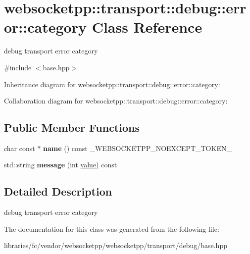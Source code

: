 \hypertarget{classwebsocketpp_1_1transport_1_1debug_1_1error_1_1category}{}\section{websocketpp\+:\+:transport\+:\+:debug\+:\+:error\+:\+:category Class Reference}
\label{classwebsocketpp_1_1transport_1_1debug_1_1error_1_1category}


debug transport error category  




{\ttfamily \#include $<$base.\+hpp$>$}



Inheritance diagram for websocketpp\+:\+:transport\+:\+:debug\+:\+:error\+:\+:category\+:


Collaboration diagram for websocketpp\+:\+:transport\+:\+:debug\+:\+:error\+:\+:category\+:
\subsection*{Public Member Functions}
\begin{DoxyCompactItemize}
\item 
\mbox{\label{classwebsocketpp_1_1transport_1_1debug_1_1error_1_1category_a19f55b05a90e1e825a4caabd86f8ce90}} 
char const  $\ast$ {\bfseries name} () const \+\_\+\+W\+E\+B\+S\+O\+C\+K\+E\+T\+P\+P\+\_\+\+N\+O\+E\+X\+C\+E\+P\+T\+\_\+\+T\+O\+K\+E\+N\+\_\+
\item 
\mbox{\label{classwebsocketpp_1_1transport_1_1debug_1_1error_1_1category_a7d0a64e6e755b3870158d30fd1721ca5}} 
std\+::string {\bfseries message} (int \mbox{\hyperlink{namespacewebsocketpp_1_1transport_1_1debug_1_1error_a5ee6badaa3c5ebb600c4062394fac69c}{value}}) const
\end{DoxyCompactItemize}


\subsection{Detailed Description}
debug transport error category 

The documentation for this class was generated from the following file\+:\begin{DoxyCompactItemize}
\item 
libraries/fc/vendor/websocketpp/websocketpp/transport/debug/base.\+hpp\end{DoxyCompactItemize}
